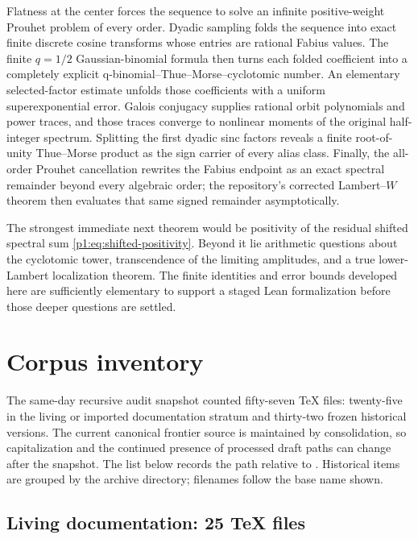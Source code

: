 \documentclass[11pt,oneside]{article}
\theoremstyle{definition}
\theoremstyle{remark}
\begin{document}
Flatness at the center forces the sequence to solve an infinite positive-weight
Prouhet problem of every order.  Dyadic sampling folds the sequence into exact
finite discrete cosine transforms whose entries are rational Fabius values.
The finite $q=1/2$ Gaussian-binomial formula then turns each folded coefficient
into a completely explicit q-binomial--Thue--Morse--cyclotomic number.  An
elementary selected-factor estimate unfolds those coefficients with a uniform
superexponential error.  Galois conjugacy supplies rational orbit polynomials
and power traces, and those traces converge to nonlinear moments of the original
half-integer spectrum.  Splitting the first dyadic sinc factors reveals a finite
root-of-unity Thue--Morse product as the sign carrier of every alias class.
Finally, the all-order Prouhet cancellation rewrites the Fabius endpoint as an
exact spectral remainder beyond every algebraic order; the repository's
corrected Lambert--$W$ theorem then evaluates that same signed remainder
asymptotically.

The strongest immediate next theorem would be positivity of the residual
shifted spectral sum \eqref{p1:eq:shifted-positivity}.  Beyond it lie arithmetic
questions about the cyclotomic tower, transcendence of the limiting amplitudes,
and a true lower-Lambert localization theorem.  The finite identities and error
bounds developed here are sufficiently elementary to support a staged Lean
formalization before those deeper questions are settled.

\appendix

\section{Corpus inventory}\label{p1:app:inventory}

The same-day recursive audit snapshot counted fifty-seven TeX files: twenty-five in the living or imported documentation stratum and thirty-two frozen historical versions.  The current canonical frontier source is maintained by consolidation, so capitalization and the continued presence of processed draft paths can change after the snapshot. The list below records the path
relative to . Historical items are grouped by
the archive directory; filenames follow the base name shown.

\subsection{Living documentation: 25 TeX files}
\end{document}
